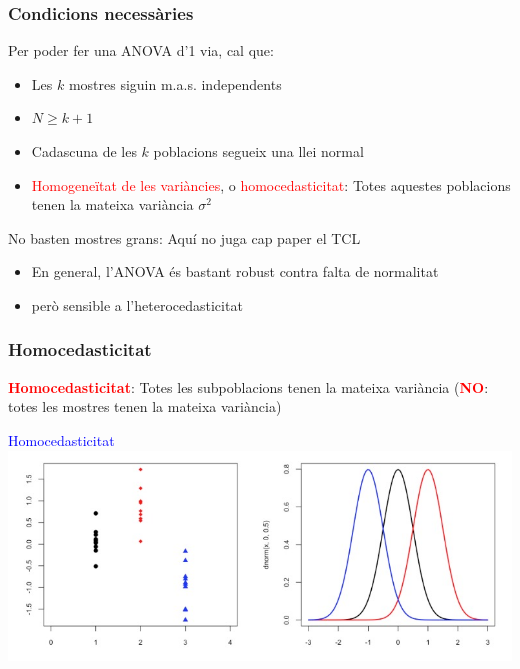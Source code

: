 \documentclass[12pt,t]{beamer}
\newcommand{\red}[1]{\textcolor{red}{#1}}
\newcommand{\blue}[1]{\textcolor{blue}{#1}}
\renewcommand{\emph}[1]{{\color{red}#1}}
\renewcommand{\geq}{\geqslant}
\theoremstyle{plain}
\theoremstyle{definition}
\begin{document}
\begin{frame}
\frametitle{Condicions necessàries}

Per poder fer una ANOVA d'1 via, cal que:
\begin{itemize}
\item Les $k$ mostres siguin m.a.s. independents
\medskip

\item $N\geq k+1$\medskip

\item Cadascuna de les $k$ poblacions segueix una llei normal
\medskip

\item \red{Homogeneïtat de les variàncies}, o \red{homocedasticitat}: Totes aquestes poblacions tenen la mateixa variància $\sigma^2$
\end{itemize}\medskip


\emph{No basten mostres grans}: Aquí no juga cap paper el TCL 
\begin{itemize}
\item En general, l'ANOVA és bastant robust contra falta de normalitat

\item però sensible a l'heterocedasticitat
\end{itemize}

\end{frame}

\begin{frame}
\frametitle{Homocedasticitat}

\red{\bf Homocedasticitat}: Totes les subpoblacions tenen la mateixa variància  (\red{\bf NO}: totes les mostres tenen la mateixa variància)

\begin{center}
\blue{Homocedasticitat}\\[1ex]
\includegraphics[width=\linewidth]{homoc}
\end{center}

\end{frame}
\end{document}
